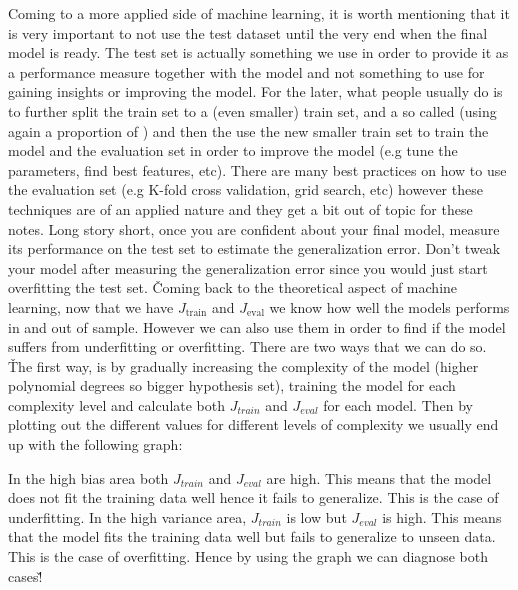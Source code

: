 Coming to a more applied side of machine learning, it is worth mentioning that it is very important to not use the
test dataset until the very end when the final model is ready. The test set is actually something we use in order to
provide it as a performance measure together with the model and not something to use for gaining insights or
improving the model. For the later, what people usually do is to further split the train set to a  (even
smaller) train set, and a so called  (using again a proportion of ) and then the
use the new smaller train set to train the model and the evaluation set in order to improve the model (e.g tune the
parameters, find best features, etc). There are many best practices on how to use the evaluation set (e.g K-fold
cross validation, grid search, etc) however these techniques are of an applied nature and they get a bit out of topic
for these notes. Long story short, once you are confident about your final model, measure its performance on the test
set to estimate the generalization error. Don't tweak your model after measuring the generalization error since you
would just start overfitting the test set. \v

Coming back to the theoretical aspect of machine learning, now that we have $J_{\text{train}} $ and $J_{\text{eval}}
$ we know how well the models performs in and out of sample. However we can also use them in order to find if the
model suffers from underfitting or overfitting. There are two ways that we can do so. \v

The first way, is by gradually increasing the complexity of the model (higher polynomial degrees so bigger hypothesis
set), training the model for each complexity level and calculate both $J_{train}$ and $J_{eval}$ for each model. Then
by plotting out the different values for different levels of complexity we usually end up with the following graph:

\vspace{-10pt}


\vspace{-10pt}

In the high bias area both $J_{train}$ and $J_{eval}$ are high. This means that the model does not fit the training
data well hence it fails to generalize. This is the case of underfitting. In the high variance area, $J_{train}$ is
low but $J_{eval}$ is high. This means that the model fits the training data well but fails to generalize to unseen
data. This is the case of overfitting. Hence by using the graph we can diagnose both cases!\v

